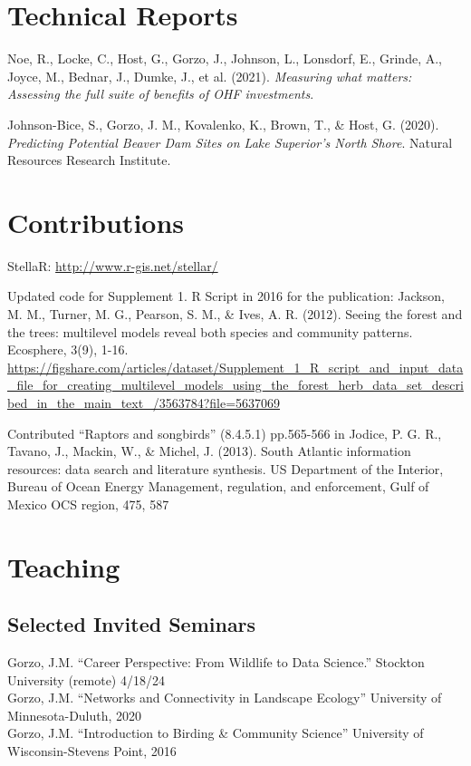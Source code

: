 \documentclass[11pt,a4paper,]{awesome-cv}
\newlength{\cslhangindent}
\newenvironment{CSLReferences}[2] %
 {\begin{list}{}{%
  \setlength{\itemindent}{0pt}
  \setlength{\leftmargin}{0pt}
  \setlength{\parsep}{0pt}
  \ifodd #1
   \setlength{\leftmargin}{\cslhangindent}
   \setlength{\itemindent}{-1\cslhangindent}
  \fi
  \setlength{\itemsep}{#2\baselineskip}}}
 {\end{list}}
\begin{document}
\section{Technical Reports}\label{technical-reports}

\label{refs-972c61dc0a31e77772ca1bd1a185967e}
\begin{CSLReferences}{1}{0}
Noe, R., Locke, C., Host, G., Gorzo, J., Johnson, L., Lonsdorf, E.,
Grinde, A., Joyce, M., Bednar, J., Dumke, J., et al. (2021).
\emph{Measuring what matters: Assessing the full suite of benefits of
OHF investments}.

Johnson-Bice, S., Gorzo, J. M., Kovalenko, K., Brown, T., \& Host, G.
(2020). \emph{Predicting Potential Beaver Dam Sites on Lake Superior's
North Shore}. Natural Resources Research Institute.

\end{CSLReferences}

\section{Contributions}\label{contributions}

StellaR: \url{http://www.r-gis.net/stellar/}

Updated code for Supplement 1. R Script in 2016 for the publication:
Jackson, M. M., Turner, M. G., Pearson, S. M., \& Ives, A. R. (2012).
Seeing the forest and the trees: multilevel models reveal both species
and community patterns. Ecosphere, 3(9), 1-16.
\url{https://figshare.com/articles/dataset/Supplement_1_R_script_and_input_data_file_for_creating_multilevel_models_using_the_forest_herb_data_set_described_in_the_main_text_/3563784?file=5637069}

Contributed ``Raptors and songbirds'' (8.4.5.1) pp.565-566 in Jodice, P.
G. R., Tavano, J., Mackin, W., \& Michel, J. (2013). South Atlantic
information resources: data search and literature synthesis. US
Department of the Interior, Bureau of Ocean Energy Management,
regulation, and enforcement, Gulf of Mexico OCS region, 475, 587

\section{Teaching}\label{teaching}

\subsection{Selected Invited Seminars}\label{selected-invited-seminars}

Gorzo, J.M. ``Career Perspective: From Wildlife to Data Science.''
Stockton University (remote) 4/18/24\\
Gorzo, J.M. ``Networks and Connectivity in Landscape Ecology''
University of Minnesota-Duluth, 2020\\
Gorzo, J.M. ``Introduction to Birding \& Community Science'' University
of Wisconsin-Stevens Point, 2016
\end{document}
